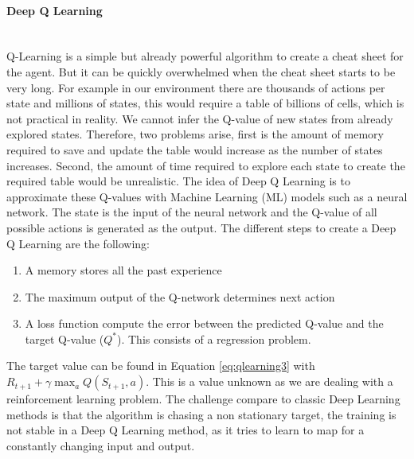         \paragraph{Deep Q Learning}~\\
        Q-Learning is a simple but already powerful algorithm to create a cheat sheet for the agent. But it can be quickly overwhelmed when the cheat sheet starts to be very long. For example in our environment there are thousands of actions per state and millions of states, this would require a table of billions of cells, which is not practical in reality. We cannot infer the Q-value of new states from already explored states. Therefore, two problems arise, first is the amount of memory required to save and update the table would increase as the number of states increases. Second, the amount of time required to explore each state to create the required table would be unrealistic. The idea of Deep Q Learning is to approximate these Q-values with Machine Learning (ML) models such as a neural network. The state is the input of the neural network and the Q-value of all possible actions is generated as the output. The different steps to create a Deep Q Learning are the following:
        \begin{enumerate}
            \item A memory stores all the past experience
            \item The maximum output of the Q-network determines next action
            \item A loss function compute the error between the predicted Q-value and the target Q-value ($Q^*$). This consists of a regression problem.
        \end{enumerate}
        The target value can be found in Equation \ref{eq:qlearning3} with $R_{t+1} + \gamma \max_a Q(S_{t+1}, a)$. This is a value unknown as we are dealing with a reinforcement learning problem. The challenge compare to classic Deep Learning methods is that the algorithm is chasing a non stationary target, the training is not stable in a Deep Q Learning method, as it tries to learn to map for a constantly changing input and output.
        
